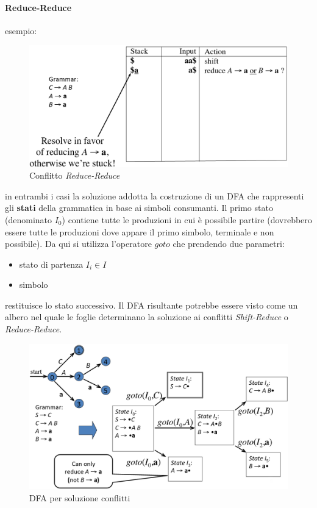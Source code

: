 \paragraph{Reduce-Reduce}
esempio:
\begin{figure}[H]
\begin{center}
\includegraphics[scale=0.4]{res/image/reduce-reduce}
\caption{Conflitto \textit{Reduce-Reduce}}
\label{img:reduce-reduce}
\end{center}
\end{figure}

in entrambi i casi la soluzione addotta la costruzione di un DFA che rappresenti
gli \textbf{stati} della grammatica in base ai simboli consumanti. Il primo
stato (denominato $I_0$) contiene tutte le produzioni in cui \`e possibile
partire (dovrebbero essere tutte le produzioni dove appare il primo simbolo,
terminale e non possibile). Da qui si utilizza l'operatore $goto$ che
prendendo due parametri:
\begin{itemize}
\item stato di partenza $I_i \in I$
\item simbolo
\end{itemize}
restituisce lo stato successivo. Il DFA risultante potrebbe essere visto come un
albero nel quale le foglie determinano la soluzione ai conflitti
\textit{Shift-Reduce} o \textit{Reduce-Reduce}.

\begin{figure}[H]
\begin{center}
\includegraphics[scale=0.25]{res/image/dfa_shift_reduce}
\caption{DFA per soluzione conflitti}
\label{img:dfa_shift_reduce}
\end{center}
\end{figure}

